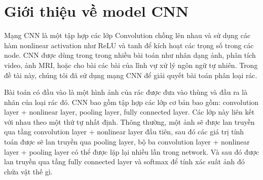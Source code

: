 \section{Giới thiệu về model CNN}
Mạng CNN là một tập hợp các lớp Convolution chồng lên nhau và sử dụng các hàm nonlinear activation như ReLU và tanh để kích hoạt các trọng số trong các node. 
CNN được dùng trong trong nhiều bài toán như nhân dạng ảnh, phân tích video, ảnh MRI, hoặc cho bài các bài của lĩnh vự xử lý ngôn ngữ tự nhiên. Trong đề tài này, chúng tôi đã sử dụng mạng CNN để giải quyết bài toán phân loại rác.

Bài toán có đầu vào là một hình ảnh của rác được đưa vào thùng và đầu ra là nhãn của loại rác đó.
CNN bao gồm tập hợp các lớp cơ bản bao gồm: convolution layer + nonlinear layer, pooling layer, fully connected layer. 
Các lớp này liên kết với nhau theo một thứ tự nhất định. Thông thường, một ảnh sẽ được lan truyền qua tầng convolution layer + nonlinear layer đầu tiên, sau đó các giá trị tính toán được sẽ lan truyền qua pooling layer, bộ ba convolution layer + nonlinear layer + pooling layer có thể được lặp lại nhiều lần trong network. Và sau đó được lan truyền qua tầng fully connected layer và softmax để tính xác suất ảnh đó chứa vật thế gì.

